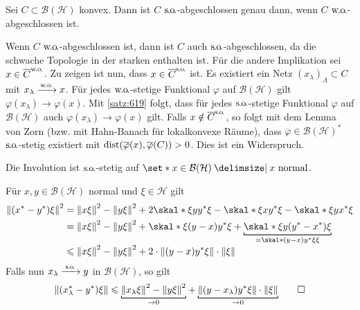 \begin{proposition}[{name=[konvexe Menge stark abgeschlossen]},label=prop:620]
	Sei $C \subset \mathcal{B}(\mathcal{H})$ konvex.
	Dann ist $C$ $\mathrm{s\mkern-1.4mu.\mkern-.6mu o\mkern-1.7mu.}$-abgeschlossen genau dann, wenn $C$ $\mathrm{w\mkern-1.7mu.\mkern-.45mu o\mkern-1.7mu.}$-abgeschlossen ist.
\end{proposition}
\begin{beweis}[Idee]
	Wenn $C$ $\mathrm{w\mkern-1.7mu.\mkern-.45mu o\mkern-1.7mu.}$-abgeschlossen ist, dann ist $C$ auch $\mathrm{s\mkern-1.4mu.\mkern-.6mu o\mkern-1.7mu.}$-abgeschlossen, da die schwache Topologie in der starken enthalten ist.
	Für die andere Implikation sei $x \in \overline{C}^{\mathrm{w\mkern-1.7mu.\mkern-.45mu o\mkern-1.7mu.}}$. Zu zeigen ist nun, dass $x \in \overline{C}^{\mathrm{s\mkern-1.4mu.\mkern-.6mu o\mkern-1.7mu.}}$ ist. 
	Es existiert ein Netz $(x_\lambda)_\Lambda \subset C$ mit $x_\lambda \grenzw{\wo}x$.
	Für jedes $\mathrm{w\mkern-1.7mu.\mkern-.45mu o\mkern-1.7mu.}$-stetige Funktional $\varphi$ auf $\mathcal{B}(\mathcal{H})$ gilt $\varphi(x_\lambda) \to \varphi(x)$.
	Mit \autoref{satz:619} folgt, dass für jedes $\mathrm{s\mkern-1.4mu.\mkern-.6mu o\mkern-1.7mu.}$-stetige Funktional $\varphi$ auf $\mathcal{B}(\mathcal{H})$ auch $\varphi(x_\lambda) \to \varphi(x)$ gilt.
	Falls $x \notin \overline{C}^{\mathrm{s\mkern-1.4mu.\mkern-.6mu o\mkern-1.7mu.}}$, so folgt mit dem Lemma von Zorn (bzw. mit Hahn-Banach für lokalkonvexe Räume), dass $\overline{\varphi} \in \mathcal{B}(\mathcal{H})^*$ $\mathrm{s\mkern-1.4mu.\mkern-.6mu o\mkern-1.7mu.}$-stetig existiert mit $\operatorname{dist}(\overline{\varphi}(x),\overline{\varphi}(C))>0$.
	Dies ist ein Widerspruch.
\end{beweis}

\begin{proposition}[label=prop:621,{name=[Involution stark stetig auf einer Teilmenge]}]
	Die Involution ist $\mathrm{s\mkern-1.4mu.\mkern-.6mu o\mkern-1.7mu.}$-stetig auf $\set*{x \in \mathcal{B}(\mathcal{H}) \given x \text{ normal} }$.
\end{proposition}
\begin{beweis}
	Für $x,y \in \mathcal{B}(\mathcal{H})$ normal und $\xi \in \mathcal{H}$ gilt 
	\begin{align}
		\norm*{(x^*-y^*) \xi}^2 &= \norm*{x \xi}^2 - \norm*{y \xi}^2 + 2 \skal*{\xi}{yy^* \xi} - \skal*{\xi}{xy^* \xi} - \skal*{\xi}{yx^* \xi} \\
		&= \norm*{x \xi}^2 - \norm*{y \xi}^2 + \skal*{\xi}{(y-x)y^* \xi} + \Underbracket{\skal*{\xi}{y(y^*-x^*)\xi}}{=\skal*{(y-x)y^* \xi}{\xi}} \\[-.8ex]
		&\le \norm*{x \xi}^2 - \norm*{y \xi}^2 + 2 \cdot \norm*{(y-x)y^* \xi} \cdot \norm*{\xi}
	\end{align}
	Falls nun $x_\lambda \grenzw{\so} y$ in $\mathcal{B}(\mathcal{H})$, so gilt 
	\[
		\norm*{(x_\lambda^* -y^*)\xi} \le \Underbracket{\norm*{x_\lambda \xi}^2 - \norm*{y \xi}^2}{\to 0} + \Underbracket{\norm*{(y-x_\lambda)y^* \xi} \cdot \norm*{\xi}}{\to 0} \qedhere
	\]
\end{beweis}

